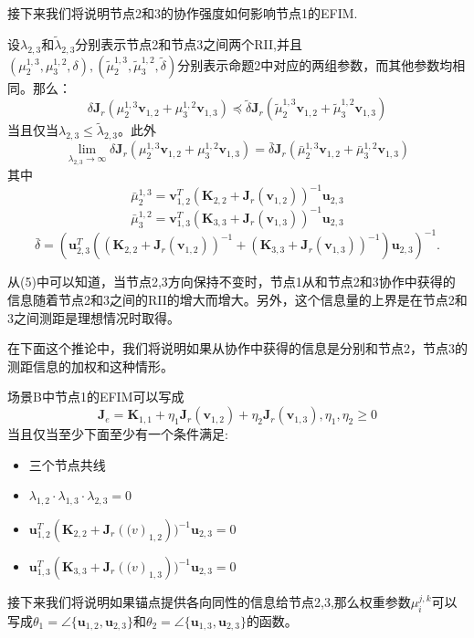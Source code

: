 接下来我们将说明节点2和3的协作强度如何影响节点1的EFIM.
\begin{corollary}
设$\lambda_{2,3}$和$\tilde{\lambda}_{2,3}$分别表示节点2和节点3之间两个RII,并且$(\mu_2^{1,3},\mu_3^{1,2},\delta),(\tilde{\mu}_2^{1,3},\tilde{\mu}_3^{1,2},\tilde{\delta})$分别表示命题2中对应的两组参数，而其他参数均相同。那么：
\begin{equation}
\delta \bm{J}_r(\mu_2^{1,3}\bm{v}_{1,2}+\mu_3^{1,2}\bm{v}_{1,3}) \preceq \tilde{\delta} \bm{J}_r(\tilde{\mu}_2^{1,3}\bm{v}_{1,2}+\tilde{\mu}_3^{1,2}\bm{v}_{1,3})
\end{equation}
当且仅当$\lambda_{2,3}\leq \tilde{\lambda}_{2,3}$。此外
\[
\lim_{\lambda_{2,3} \rightarrow \infty}\delta \bm{J}_r(\mu_2^{1,3}\bm{v}_{1,2}+\mu_3^{1,2}\bm{v}_{1,3})=\bar{\delta} \bm{J}_r(\bar{\mu}_2^{1,3}\bm{v}_{1,2}+\bar{\mu}_3^{1,2}\bm{v}_{1,3})
\]
其中
\[
\bar{\mu}_2^{1,3}=\bm{v}_{1,2}^T(\bm{K}_{2,2}+\bm{J}_r(\bm{v}_{1,2}))^{-1}\bm{u}_{2,3}
\]
\[
\bar{\mu}_3^{1,2}=\bm{v}_{1,3}^T(\bm{K}_{3,3}+\bm{J}_r(\bm{v}_{1,3}))^{-1}\bm{u}_{2,3}
\]
\[
\bar{\delta}=(\bm{u}_{2,3}^T((\bm{K}_{2,2}+\bm{J}_r(\bm{v}_{1,2}))^{-1}+(\bm{K}_{3,3}+\bm{J}_r(\bm{v}_{1,3}))^{-1})\bm{u}_{2,3})^{-1}.
\]
\end{corollary}
\begin{remark}
从(5)中可以知道，当节点2,3方向保持不变时，节点1从和节点2和3协作中获得的信息随着节点2和3之间的RII的增大而增大。另外，这个信息量的上界是在节点2和3之间测距是理想情况时取得。
\end{remark}
在下面这个推论中，我们将说明如果从协作中获得的信息是分别和节点2，节点3的测距信息的加权和这种情形。
\begin{corollary}
场景B中节点1的EFIM可以写成
\[
\bm{J}_e=\bm{K}_{1,1}+\eta_1 \bm{J}_r(\bm{v}_{1,2})+\eta_2 \bm{J}_r(\bm{v}_{1,3}),\eta_1,\eta_2 \geq 0
\]
当且仅当至少下面至少有一个条件满足:
\begin{itemize}
\item{三个节点共线}
\item $\lambda_{1,2}\cdot \lambda_{1,3}\cdot \lambda_{2,3}=0$
\item $\bm{u}_{1,2}^T(\bm{K}_{2,2}+\bm{J}_r(\bm(v)_{1,2}))^{-1}\bm{u}_{2,3}=0$
\item $\bm{u}_{1,3}^T(\bm{K}_{3,3}+\bm{J}_r(\bm(v)_{1,3}))^{-1}\bm{u}_{2,3}=0$
\end{itemize}
\end{corollary}
接下来我们将说明如果锚点提供各向同性的信息给节点2,3,那么权重参数$\mu_i^{j,k}$可以写成$\theta_1=\angle \{\bm{u}_{1,2},\bm{u}_{2,3}\}$和$\theta_2=\angle \{\bm{u}_{1,3},\bm{u}_{2,3}\}$的函数。
